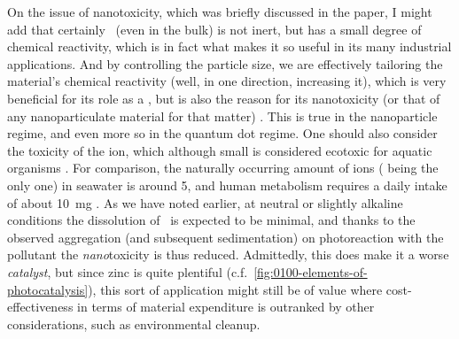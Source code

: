\documentclass[webedition,openright,titles,swedish,english]{LuaUUThesis}\usepackage[]{graphicx}\usepackage[]{xcolor}
\newcommand{\cf}{c.f.}
\begin{document}
On the issue of nanotoxicity, which was briefly discussed in the paper,
I might add that certainly \ZnO\ (even in the bulk) is not inert, but has
a small degree of chemical reactivity, which is in fact what makes it so useful
in its many industrial applications.
And by controlling the particle size, we are effectively tailoring the material's
chemical reactivity (well, in one direction, increasing it), which is very
beneficial for its role as a , but is also the reason
for its nanotoxicity (or that of any nanoparticulate material for that matter)
\cite{Zhang2012,Zhang2021a,Mitchell2019,Reed2012}.
This is true in the nanoparticle  regime, and even more so in the quantum dot regime.
One should also consider the toxicity of the  ion, which although
small is considered ecotoxic for aquatic organisms \cite{Moezzi2012}. For comparison,
the naturally occurring amount of  ions ( being the only one)
in seawater is around \qty{5}{\ppb}, and human metabolism requires a daily intake
of about \qty{10}{\mg} \cite{Moezzi2012}.
As we have noted earlier, at neutral or slightly alkaline conditions the dissolution
of \ZnO\ is expected to be minimal, and thanks to the observed aggregation (and
subsequent sedimentation) on photoreaction with the pollutant the \emph{nano}toxicity
is thus reduced. Admittedly, this does make it a worse \emph{catalyst}, but
since zinc is quite plentiful (\cf\ \cref{fig:0100-elements-of-photocatalysis}),
this sort of application might still be of value where cost-effectiveness in
terms of material expenditure is outranked by other considerations, such as
environmental cleanup.


%

%
\end{document}
